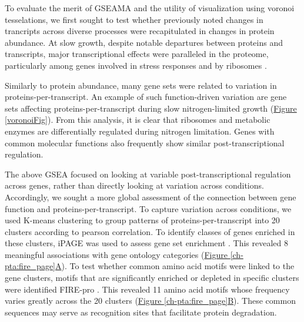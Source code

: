 To evaluate the merit of GSEAMA and the utility of visualization using voronoi tesselations, we first sought to test whether previously noted changes in trancripts across diverse processes were recapitulated in changes in protein abundance. At slow growth, despite notable departures between proteins and transcripts, major transcriptional effects were paralleled in the proteome, particularly among genes involved in stress responses and by ribosomes \cite{Brauer:2008jn}.

Similarly to protein abundance, many gene sets were related to variation in proteins-per-transcript. An example of such function-driven variation are gene sets affecting proteins-per-transcript during slow nitrogen-limited growth (\hyperref[voronoiFig]{Figure \ref{voronoiFig}}). From this analysis, it is clear that ribosomes and metabolic enzymes are differentially regulated during nitrogen limitation. Genes with common molecular functions also frequently show similar post-transcriptional regulation.

The above GSEA focused on looking at variable post-transcriptional regulation across genes, rather than directly looking at variation across conditions. Accordingly, we sought a more global assessment of the connection between gene function and proteins-per-transcript. To capture variation across conditions, we used K-means clustering to group patterns of proteins-per-transcript into 20 clusters according to pearson correlation.  To identify classes of genes enriched in these clusters, iPAGE was used to assess gene set enrichment \cite{Goodarzi:2009cf}. This revealed 8 meaningful associations with gene ontology categories (\hyperref[ch-pta:fire_page]{Figure \ref{ch-pta:fire_page}A}). To test whether common amino acid motifs were linked to the gene clusters, motifs that are significantly enriched or depleted in specific clusters were identified FIRE-pro \cite{Lieber:2010fr}. This revealed 11 amino acid motifs whose frequency varies greatly across the 20 clusters (\hyperref[ch-pta:fire_page]{Figure \ref{ch-pta:fire_page}B}). These common sequences may serve as recognition sites that facilitate protein degradation.


